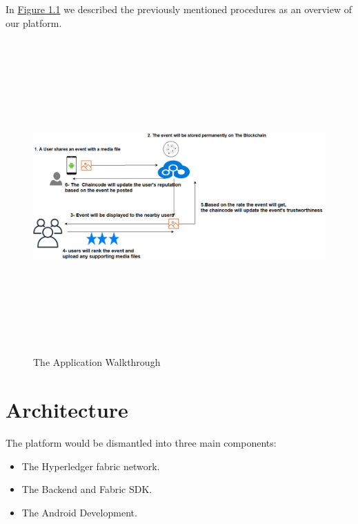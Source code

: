 \cleardoublepage
	In \hyperref[fig:appflow]{Figure 1.1} we described the previously mentioned procedures as an overview of our platform.
	\begin{figure}[H]
	\includegraphics[width=15cm,height=12cm]{images/appflow.png}
	\caption{The Application Walkthrough}
	\label{fig:appflow}
	\end{figure}

\cleardoublepage

\section{Architecture}
The platform would be dismantled into three main components: 
\begin{itemize}
  \item The Hyperledger fabric network.
  \item The Backend and Fabric SDK. 
  \item The Android Development. 
\end{itemize}

